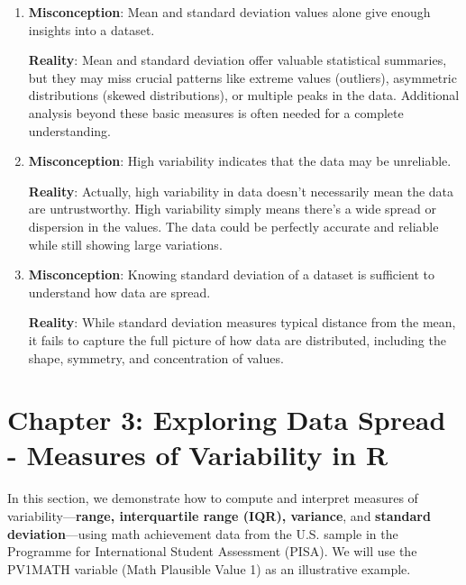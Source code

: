 \documentclass[
  letterpaper,
  DIV=11,
  numbers=noendperiod]{scrreprt}
\begin{document}
\begin{enumerate}
  \textbf{Reality}: Variability is closely linked to the central value
  used in its calculation. For instance, variance is calculated relative
  to the mean, highlighting the importance of the chosen measures of
  central tendency in interpreting variability.
\item
  \textbf{Misconception}: Mean and standard deviation values alone give
  enough insights into a dataset.

  \textbf{Reality}: Mean and standard deviation offer valuable
  statistical summaries, but they may miss crucial patterns like extreme
  values (outliers), asymmetric distributions (skewed distributions), or
  multiple peaks in the data. Additional analysis beyond these basic
  measures is often needed for a complete understanding.
\item
  \textbf{Misconception}: High variability indicates that the data may
  be unreliable.

  \textbf{Reality}: Actually, high variability in data doesn't
  necessarily mean the data are untrustworthy. High variability simply
  means there's a wide spread or dispersion in the values. The data
  could be perfectly accurate and reliable while still showing large
  variations.
\item
  \textbf{Misconception}: Knowing standard deviation of a dataset is
  sufficient to understand how data are spread.

  \textbf{Reality}: While standard deviation measures typical distance
  from the mean, it fails to capture the full picture of how data are
  distributed, including the shape, symmetry, and concentration of
  values.
\end{enumerate}


\chapter*{Chapter 3: Exploring Data Spread - Measures of Variability in
R}\label{chapter-3-exploring-data-spread---measures-of-variability-in-r}


In this section, we demonstrate how to compute and interpret measures of
variability---\textbf{range, interquartile range (IQR), variance}, and
\textbf{standard deviation}---using math achievement data from the U.S.
sample in the Programme for International Student Assessment (PISA). We
will use the PV1MATH variable (Math Plausible Value 1) as an
illustrative example.
\end{document}

